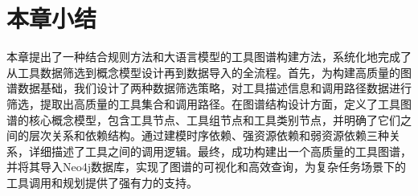 

\section{本章小结}

本章提出了一种结合规则方法和大语言模型的工具图谱构建方法，系统化地完成了从工具数据筛选到概念模型设计再到数据导入的全流程。首先，为构建高质量的图谱数据基础，我们设计了两种数据筛选策略，对工具描述信息和调用路径数据进行筛选，提取出高质量的工具集合和调用路径。在图谱结构设计方面，定义了工具图谱的核心概念模型，包含工具节点、工具组节点和工具类别节点，并明确了它们之间的层次关系和依赖结构。通过建模时序依赖、强资源依赖和弱资源依赖三种关系，详细描述了工具之间的调用逻辑。最终，成功构建出一个高质量的工具图谱，并将其导入Neo4j数据库，实现了图谱的可视化和高效查询，为复杂任务场景下的工具调用和规划提供了强有力的支持。
